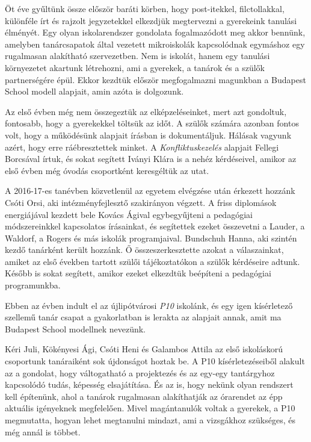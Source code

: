 Öt éve gyűltünk össze először baráti körben, hogy post-itekkel,
filctollakkal, különféle írt és rajzolt jegyzetekkel elkezdjük
megtervezni a gyerekeink tanulási élményét. Egy olyan iskolarendszer
gondolata fogalmazódott meg akkor bennünk, amelyben tanárcsapatok
által vezetett mikroiskolák kapcsolódnak egymáshoz egy rugalmasan
alakítható szervezetben. Nem is iskolát, hanem egy tanulási
környezetet akartunk létrehozni, ami a gyerekek, a tanárok és a szülők
partnerségére épül. Ekkor kezdtük először megfogalmazni magunkban a
Budapest School modell alapjait, amin azóta is dolgozunk.

 
Az első évben még nem összegeztük az elképzeléseinket, mert azt
gondoltuk, fontosabb, hogy a gyerekekkel töltsük az időt. A szülők
számára azonban fontos volt, hogy a működésünk alapjait írásban is
dokumentáljuk. Hálásak vagyunk azért, hogy erre ráébresztettek
minket. A \textit{Konfliktuskezelés\/}
alapjait Fellegi Borcsával írtuk, és sokat
segített Iványi Klára is a nehéz kérdéseivel, amikor az első évben még
óvodás csoportként keresgéltük az utat.

 
A 2016-17-es tanévben közvetlenül az egyetem elvégzése után érkezett
hozzánk Csóti Orsi,  aki  intézményfejlesztő szakirányon végzett. A
friss diplomások energiájával kezdett bele  Kovács Ágival
egybegyűjteni a pedagógiai módszereinkkel kapcsolatos írásainkat, és
segítettek ezeket összevetni a Lauder, a Waldorf, a Rogers és más
iskolák programjaival. Bundschuh Hanna, aki szintén kezdő tanárként
került hozzánk.  Ő összeszerkesztette azokat a válaszainkat, amiket az
első években tartott szülői tájékoztatókon a szülők kérdéseire adtunk.
Később is sokat
segített, amikor ezeket elkezdtük beépíteni a pedagógiai programunkba.

 
Ebben az évben indult el az újlipótvárosi \emph{P10} iskolánk, és egy igen
kísérletező szellemű tanár csapat a gyakorlatban is lerakta az alapjait annak,
amit ma Budapest School modellnek nevezünk.

Kéri Juli, Kökényesi Ági, Csóti Heni és Galambos Attila az első
iskoláskorú csoportunk tanáraiként sok újdonságot hoztak be. A P10
kísérletezéseiből alakult az a gondolat, hogy váltogatható a
projektezés és az egy-egy tantárgyhoz kapcsolódó tudás, képesség
elsajátítása. És az is, hogy nekünk olyan rendszert kell építenünk, ahol a
tanárok rugalmasan alakíthatják az órarendet az épp aktuális
igényeknek megfelelően. Mivel magántanulók voltak a gyerekek, a P10
megmutatta, hogyan lehet megtanulni mindazt, ami a vizsgákhoz
szükséges, és még annál is többet.


